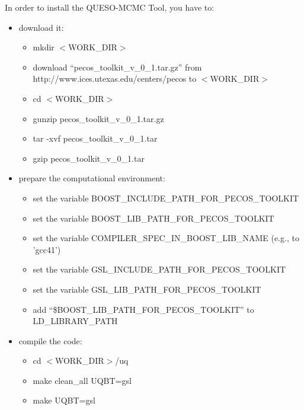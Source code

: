 In order to install the QUESO-MCMC Tool, you have to:
\begin{itemize}
\item {download it:
\begin{itemize}
\item mkdir $<$WORK\_DIR$>$
\item download ``pecos\_toolkit\_v\_0\_1.tar.gz'' from http://www.ices.utexas.edu/centers/pecos to $<$WORK\_DIR$>$
\item cd $<$WORK\_DIR$>$
\item gunzip pecos\_toolkit\_v\_0\_1.tar.gz
\item tar -xvf pecos\_toolkit\_v\_0\_1.tar
\item gzip pecos\_toolkit\_v\_0\_1.tar
\end{itemize}
}
\item {prepare the computational environment:
\begin{itemize}
\item set the variable BOOST\_INCLUDE\_PATH\_FOR\_PECOS\_TOOLKIT
\item set the variable BOOST\_LIB\_PATH\_FOR\_PECOS\_TOOLKIT
\item set the variable COMPILER\_SPEC\_IN\_BOOST\_LIB\_NAME (e.g., to 'gcc41')
\item set the variable GSL\_INCLUDE\_PATH\_FOR\_PECOS\_TOOLKIT
\item set the variable GSL\_LIB\_PATH\_FOR\_PECOS\_TOOLKIT
\item add ``\$BOOST\_LIB\_PATH\_FOR\_PECOS\_TOOLKIT'' to LD\_LIBRARY\_PATH
\end{itemize}
}
\item {compile the code:
\begin{itemize}
\item cd $<$WORK\_DIR$>$/uq
\item make clean\_all UQBT=gsl
\item make UQBT=gsl
\end{itemize}
}
\end{itemize}

